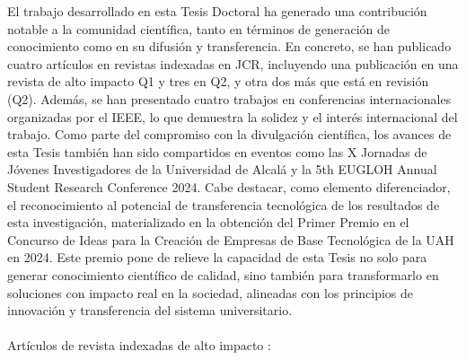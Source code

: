 El trabajo desarrollado en esta Tesis Doctoral ha generado una contribución notable a la comunidad científica, tanto en términos de generación de conocimiento como en su difusión y transferencia. En concreto, se han publicado cuatro artículos en revistas indexadas en JCR, incluyendo una publicación en una revista de alto impacto Q1 y tres en Q2, y otra dos más que está en revisión (Q2). Además, se han presentado cuatro trabajos en conferencias internacionales organizadas por el IEEE, lo que demuestra la solidez y el interés internacional del trabajo. Como parte del compromiso con la divulgación científica, los avances de esta Tesis también han sido compartidos en eventos como las X Jornadas de Jóvenes Investigadores de la Universidad de Alcalá y la 5th EUGLOH Annual Student Research Conference 2024. Cabe destacar, como elemento diferenciador, el reconocimiento al potencial de transferencia tecnológica de los resultados de esta investigación, materializado en la obtención del Primer Premio en el Concurso de Ideas para la Creación de Empresas de Base Tecnológica de la UAH en 2024. Este premio pone de relieve la capacidad de esta Tesis no solo para generar conocimiento científico de calidad, sino también para transformarlo en soluciones con impacto real en la sociedad, alineadas con los principios de innovación y transferencia del sistema universitario.\\
\\
Artículos de revista indexadas de alto impacto :

